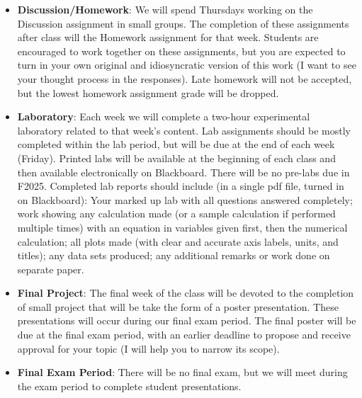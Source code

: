 \documentclass{article}
\begin{document}
\begin{itemize}
\item[] {\bf Discussion/Homework}:  We will spend Thursdays working on the Discussion assignment in small groups.  The completion of these assignments after class will the Homework assignment for that week.  Students are encouraged to work together on these assignments, but you are expected to turn in your own original and idiosyncratic version of this work (I want to see your thought process in the responses). Late homework will not be accepted, but the lowest homework assignment grade will be dropped.

\thispagestyle{empty}
\newpage

\item[] {\bf Laboratory}: Each week we will complete a two-hour experimental laboratory related to that week's content.  Lab assignments should be mostly completed within the lab period, but will be due at the end of each week (Friday). Printed labs will be available at the beginning of each class and then available electronically on Blackboard.  There will be no pre-labs due in F2025.  Completed lab reports should include (in a single pdf file, turned in on Blackboard): Your marked up lab with all questions answered completely; work showing any calculation made (or a sample calculation if performed multiple times) with an equation in variables given first, then the numerical calculation; all plots made (with clear and accurate axis labels, units, and titles); any data sets produced; any additional remarks or work done on separate paper.

\item[] {\bf Final Project}: The final week of the class will be devoted to the completion of small project that will be take the form of a poster presentation. These presentations will occur during our final exam period.  The final poster will be due at the final exam period, with an earlier deadline to propose and receive approval for your topic (I will help you to narrow its scope).

\item[] {\bf Final Exam Period}: There will be no final exam, but we will meet during the exam period to complete student presentations.



\end{itemize}
\end{document}
